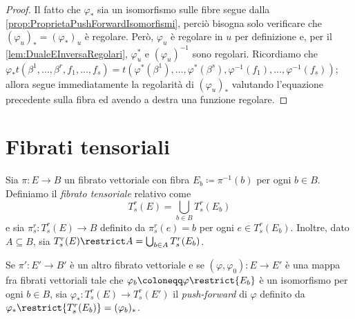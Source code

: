 \begin{proof}
	Il fatto che $\varphi_*$ sia un isomorfismo sulle fibre segue dalla \cref{prop:ProprietaPushForwardIsomorfismi}, perciò bisogna solo verificare che $(\varphi_u)_*=(\varphi_*)_u$ è regolare. Però, $\varphi_u$ è regolare in $u$ per definizione e, per il \cref{lem:DualeEInversaRegolari}, $\varphi_u^*$ e $(\varphi_u)^{-1}$ sono regolari.
	Ricordiamo che $\varphi_*t(\beta^1,\ldots,\beta^r,f_1,\ldots,f_s) = t(\varphi^*(\beta^1),\ldots,\varphi^*(\beta^s),\varphi^{-1}(f_1),\ldots,\varphi^{-1}(f_s))$; allora
	segue immediatamente la regolarità di $(\varphi_u)_*$ valutando l'equazione precedente sulla fibra ed avendo a destra una funzione regolare.
\end{proof}




\section{Fibrati tensoriali}

\begin{definition} 
	Sia $\pi:E\to B$ un fibrato vettoriale con fibra $E_b \coloneqq \pi^{-1}(b)$ per ogni $b\in B$. Definiamo il \emph{fibrato tensoriale} relativo come
	\begin{equation*}
		T_s^r(E) = \bigcup_{b\in B} T_s^r(E_b)
	\end{equation*}
	e sia $\pi_s^r:T_s^r(E)\to B$ definito da $\pi_s^r(e) = b$ per ogni $e\in T_s^r(E_b)$.
	Inoltre, dato $A\subseteq B$, sia $T_s^r(E)\restrict A = \bigcup_{b\in A} T_s^r(E_b)$.
\end{definition}

\begin{definition} 
	Se $\pi':E'\to B'$ è un altro fibrato vettoriale e se $(\varphi,\varphi_0):E\to E'$ è una mappa fra fibrati vettoriali tale che $\varphi_b \coloneqq \varphi\restrict{E_b}$ è un isomorfismo per ogni $b\in B$, sia $\varphi_*:T_s^r(E)\to T_s^r(E')$ il \emph{push-forward} di $\varphi$ definito da $\varphi_*\restrict{T_s^r(E_b)} = (\varphi_b)_*$.
\end{definition}


